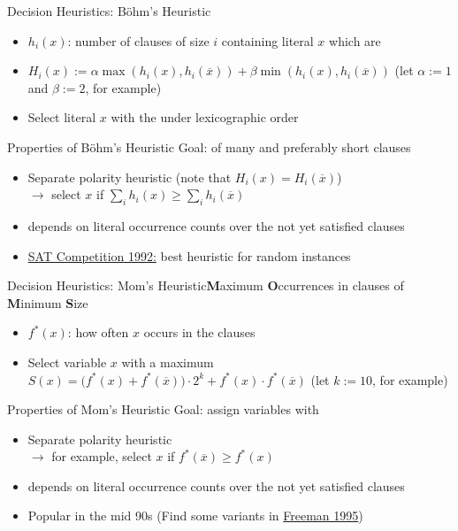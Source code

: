 \documentclass[t]{sdqbeamer2}
\begin{document}
\begin{frame}{Decision Heuristics: Böhm's Heuristic}
\begin{itemize}\setlength{\itemsep}{1ex}
	\item $h_i(x)$: number of clauses of size $i$ containing literal $x$ which are 
	\item $H_i(x) := \alpha \operatorname{max}(h_i(x), h_i(\overline{x})) + \beta \operatorname{min}(h_i(x), h_i(\overline{x}))$ \quad (let $\alpha:=1$ and $\beta:=2$, for example)
	\item Select literal $x$ with the  under lexicographic order
\end{itemize}
\begin{block}{Properties of Böhm's Heuristic}
Goal:  of many and preferably short clauses\\[1ex]
\begin{itemize}\setlength{\itemsep}{1em}
	\item Separate polarity heuristic (note that $H_i(x) = H_i(\overline x)$)\\[1ex]
		$\rightarrow$ select $x$ if $\sum_i h_i(x) \geq \sum_i h_i(\overline x)$
	\item depends on literal occurrence counts over the not yet satisfied clauses
	\item \href{https://stamm-wilbrandt.de/en/Report_on_a_SAT_competition.pdf}{SAT Competition 1992:} best heuristic for random instances
\end{itemize}
\end{block}
\end{frame}
	
\begin{frame}{Decision Heuristics: Mom's Heuristic}{\textbf{M}aximum \textbf{O}ccurrences in clauses of \textbf{M}inimum \textbf{S}ize}
\begin{itemize}\setlength{\itemsep}{1ex}
	\item $f^*(x)$: how often $x$ occurs in the  clauses
	\item Select variable $x$ with a maximum $S(x) = \bigl(f^*(x)+f^*(\overline{x})\bigr) \cdot 2^k + f^*(x) \cdot f^*(\overline{x})$ \quad (let $k:=10$, for example)
\end{itemize}
\begin{block}{Properties of Mom's Heuristic}
Goal: assign variables with \\[1ex]
\begin{itemize}\setlength{\itemsep}{1em}
	\item Separate polarity heuristic\\[1ex]
		$\rightarrow$ for example, select $x$ if $f^*(\overline x) \geq f^*(x)$
	\item depends on literal occurrence counts over the not yet satisfied clauses
	\item Popular in the mid 90s (Find some variants in \href{https://satlecture.github.io/kit2024/references/1995_Freeman_Thesis.ps}{Freeman 1995})
\end{itemize}
\end{block}
\end{frame}
	
\end{document}
